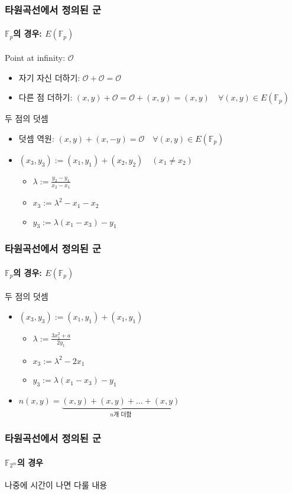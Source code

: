 \documentclass[aspectratio=169,mathserif]{beamer}
\newcommand{\Fp}{\mathbb{F}_p}
\newcommand{\Ftwom}{\mathbb{F}_{2^m}}
\begin{document}
  \begin{frame}
    \frametitle{타원곡선에서 정의된 군}
    \framesubtitle{\(\Fp\)의 경우: \(E(\Fp)\)}

    Point at infinity: \(\mathcal{O}\)
    \begin{itemize}
      \item 자기 자신 더하기: \(\mathcal{O} + \mathcal{O} = \mathcal{O}\)
      \item 다른 점 더하기: \((x,y) + \mathcal{O} = \mathcal{O} + (x,y) = (x,y)\quad\forall (x,y)\in E(\Fp)\)
    \end{itemize}
    \pause
    두 점의 덧셈
    \begin{itemize}
      \item 덧셈 역원: \((x,y) + (x,-y) = \mathcal{O}\quad\forall (x,y)\in E(\Fp)\)
      \item \((x_3,y_3) := (x_1,y_1) + (x_2,y_2)\quad(x_1\not=x_2)\)
      \pause
      \begin{itemize}
        \item \(\lambda := \frac{y_2-y_1}{x_2-x_1}\)
        \item \(x_3 := \lambda^2 - x_1 - x_2\)
        \item \(y_3 := \lambda(x_1 - x_3) - y_1\)
      \end{itemize}
    \end{itemize}
  \end{frame}

  \begin{frame}
    \frametitle{타원곡선에서 정의된 군}
    \framesubtitle{\(\Fp\)의 경우: \(E(\Fp)\)}

    두 점의 덧셈
    \begin{itemize}
      \item \((x_3,y_3) := (x_1,y_1) + (x_1,y_1)\)
      \pause
      \begin{itemize}
        \item \(\lambda := \frac{3x_1^2+a}{2y_1}\)
        \item \(x_3 := \lambda^2 - 2x_1\)
        \item \(y_3 := \lambda(x_1 - x_3) - y_1\)
      \end{itemize}
      \pause
      \item \(n(x,y)=\underbrace{(x,y) + (x,y) + \dots + (x,y)}_{n\text{개 더함}}\)
    \end{itemize}
  \end{frame}

  \begin{frame}
    \frametitle{타원곡선에서 정의된 군}
    \framesubtitle{\(\Ftwom\)의 경우}

    나중에 시간이 나면 다룰 내용
  \end{frame}
\end{document}
